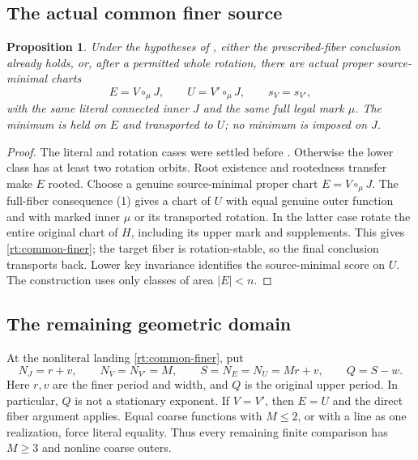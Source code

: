 \documentclass[11pt,a4paper]{amsart}
\numberwithin{equation}{section}
\theoremstyle{plain}
\newtheorem{proposition}[theorem]{Proposition}
\theoremstyle{definition}
\begin{document}
\subsection{The actual common finer source}

\begin{proposition}\label{rt:lower-landing}
Under the hypotheses of , either the prescribed-fiber conclusion already holds, or, after a permitted whole rotation, there are actual proper source-minimal charts
\begin{equation}\label{rt:common-finer}
 E=V\circ_\mu J,\qquad U=V'\circ_\mu J,\qquad s_V=s_{V'},
\end{equation}
with the same literal connected inner \(J\) and the same full legal mark \(\mu\).  The minimum is held on \(E\) and transported to \(U\); no minimum is imposed on \(J\).
\end{proposition}
\begin{proof}
The literal and rotation cases were settled before .  Otherwise the lower class has at least two rotation orbits.  Root existence and rootedness transfer make \(E\) rooted.  Choose a genuine source-minimal proper chart \(E=V\circ_\mu J\).  The full-fiber consequence (1) gives a chart of \(U\) with equal genuine outer function and with marked inner \(\mu\) or its transported rotation.  In the latter case rotate the entire original chart of \(H\), including its upper mark and supplements.  This gives \eqref{rt:common-finer}; the target fiber is rotation-stable, so the final conclusion transports back.  Lower key invariance identifies the source-minimal score on \(U\).  The construction uses only classes of area \(|E|<n\).
\end{proof}

\subsection{The remaining geometric domain}

At the nonliteral landing \eqref{rt:common-finer}, put
\begin{equation}\label{rt:finer-parameters}
 N_J=r+v,\qquad N_V=N_{V'}=M,\qquad
 S=N_E=N_U=Mr+v,\qquad Q=S-w.
\end{equation}
Here \(r,v\) are the finer period and width, and \(Q\) is the original upper period.  In particular, \(Q\) is not a stationary exponent.  If \(V=V'\), then \(E=U\) and the direct fiber argument applies.  Equal coarse functions with \(M\le2\), or with a line as one realization, force literal equality.  Thus every remaining finite comparison has \(M\ge3\) and nonline coarse outers.
\end{document}
